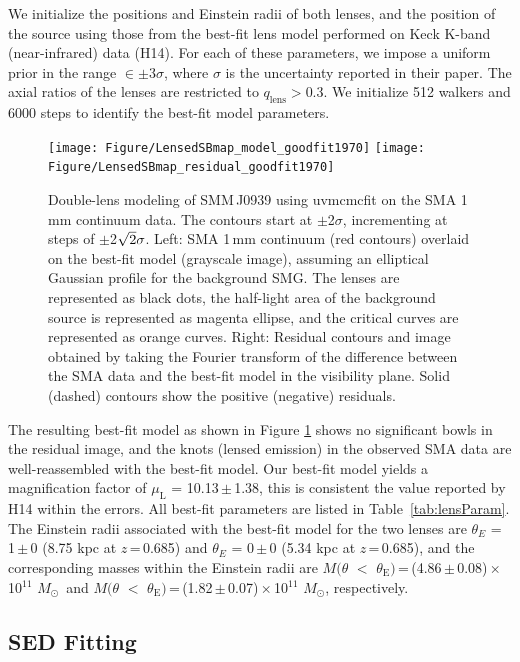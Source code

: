\documentclass[twocolumn,apj,numberedappendix]{emulateapj}
\newcommand{\Msun}{\mbox{$M_{\odot}$}}
\begin{document}
We initialize the positions and Einstein radii of both lenses, and the position of the source using those
 from the best-fit lens model performed on Keck K-band (near-infrared) data (H14). For each of
these parameters, we impose a uniform prior in the range $\in\pm$3$\sigma$, where $\sigma$ is the uncertainty
reported in their paper. The axial ratios of the lenses are restricted to $q_\textrm{lens} > 0.3$. We initialize 512
walkers and 6000 steps to identify the best-fit model parameters.
\begin{figure}[!tbpH]
\centering
\texttt{[image: Figure/LensedSBmap\_model\_goodfit1970]}
\texttt{[image: Figure/LensedSBmap\_residual\_goodfit1970]}
\caption{Double-lens modeling of SMM\,J0939 using {\sc uvmcmcfit} on the SMA 1\,mm continuum data.
The contours start at $\pm$2$\sigma$, incrementing at
steps of $\pm$2$\sqrt{\rm 2}\sigma$. Left: SMA 1\,mm continuum (red contours) overlaid on the best-fit model (grayscale image), assuming an elliptical Gaussian profile for the background SMG. The lenses are represented as black dots, the half-light area of the background source is represented as magenta ellipse, and the critical curves are represented as orange curves.
Right: Residual contours and image obtained by taking the Fourier transform of the difference between the SMA data and the best-fit model in the visibility plane. Solid (dashed) contours show the positive (negative) residuals.\label{fig:lens}}
\end{figure}

The resulting best-fit model as shown in Figure\,\,\ref{fig:lens} shows no significant bowls in the residual
image, and the knots (lensed emission) in the observed SMA data are well-reassembled with the best-fit model.
Our best-fit model yields a magnification
factor of $\mu_\textrm{L}$ = 10.13\,$\pm$\,1.38, this is consistent the value reported by H14 within the errors. All best-fit
parameters are listed in Table~\ref{tab:lensParam}. The Einstein radii associated with the best-fit model for the two lenses are $\theta_{E}$ = 1\,$\pm$\,0 (8.75 kpc at $z$\,=\,0.685) and $\theta_{E}$ = 0\,$\pm$\,0 (5.34\,\,kpc at $z$\,=\,0.685), and
the corresponding masses within the Einstein radii are $M(\theta$\,\,$<$\,\,$\theta_\textrm{E})$\,=\,(4.86\,$\pm$\,0.08)\,$\times$\,10$^{11}$\,\,\Msun\ and $M(\theta$\,\,$<$\,\,$\theta_\textrm{E})$\,=\,(1.82\,$\pm$\,0.07)\,$\times$\,10$^{11}$\,\,\Msun, respectively.


\subsection{SED Fitting} \label{sec:SED}
\end{document}
